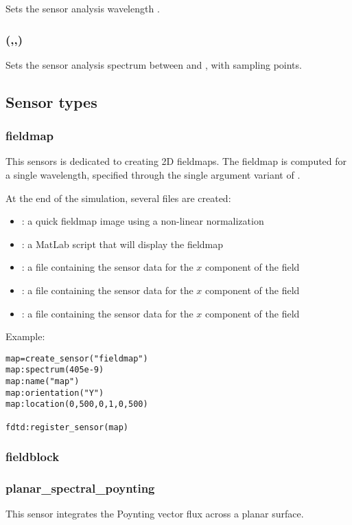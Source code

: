 Sets the sensor analysis wavelength .

\subsubsection[spectrum (three arguments)]{(,,)}

Sets the sensor analysis spectrum between  and , with  sampling points.

\subsection{Sensor types}

\subsubsection{fieldmap}

This sensors is dedicated to creating 2D fieldmaps. The fieldmap is computed for a single wavelength, specified through the single argument variant of .
	
At the end of the simulation, several files are created:
\begin{itemize}
	\item {}: a quick fieldmap image using a non-linear normalization
	\item {}: a MatLab script that will display the fieldmap
	\item {}: a file containing the sensor data for the $x$ component of the field
	\item {}: a file containing the sensor data for the $x$ component of the field
	\item {}: a file containing the sensor data for the $x$ component of the field
\end{itemize}
Example:
\begin{lstlisting}
map=create_sensor("fieldmap")
map:spectrum(405e-9)
map:name("map")
map:orientation("Y")
map:location(0,500,0,1,0,500)

fdtd:register_sensor(map)
\end{lstlisting}

\subsubsection{fieldblock}

\subsubsection{planar\_spectral\_poynting}

\fwarn
This sensor integrates the Poynting vector flux across a planar surface.
